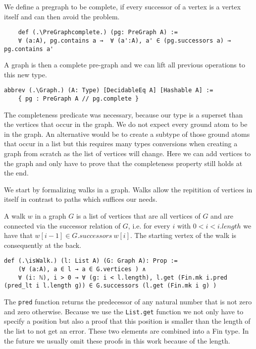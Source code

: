 We define a pregraph to be complete, if every successor of a vertex is a vertex itself and can then avoid the problem.

\begin{lstlisting}
    def (.\PreGraphcomplete.) (pg: PreGraph A) := 
    ∀ (a:A), pg.contains a →  ∀ (a':A), a' ∈ (pg.successors a) → pg.contains a'
\end{lstlisting}

A graph is then a complete pre-graph and we can lift all previous operations to this new type.
\begin{lstlisting}
abbrev (.\Graph.) (A: Type) [DecidableEq A] [Hashable A] := 
    { pg : PreGraph A // pg.complete }
\end{lstlisting}

The completeness predicate was necessary, because our type is a superset than the vertices that occur in the graph. We do not expect every ground atom to be in the graph. An alternative would be to create a subtype of those ground atoms that occur in a list but this requires many types conversions when creating a graph from scratch as the list of vertices will change. Here we can add vertices to the graph and only have to prove that the completeness property still holds at the end.

We start by formalizing walks in a graph. Walks allow the repitition of vertices in itself in contrast to paths which suffices our needs. 

A walk $w$ in a graph $G$ is a list of vertices that are all vertices of $G$ and are connected via the successor relation of $G$, i.e. for every $i$ with $0 < i < i.length$ we have that $w[i-1] \in G.successors\ w[i]$. The starting vertex of the walk is consequently at the back.

\begin{lstlisting}
def (.\isWalk.) (l: List A) (G: Graph A): Prop :=
    (∀ (a:A), a ∈ l → a ∈ G.vertices ) ∧ 
    ∀ (i: ℕ), i > 0 → ∀ (g: i < l.length), l.get (Fin.mk i.pred (pred_lt i l.length g)) ∈ G.successors (l.get (Fin.mk i g) )
\end{lstlisting}

The \lstinline|pred| function returns the predecessor of any natural number that is not zero and zero otherwise. Because we use the \lstinline|List.get| function we not only have to specify a position but also a proof that this position is smaller than the length of the list to not get an error. These two elements are combined into a Fin type. In the future we usually omit these proofs in this work because of the length.

